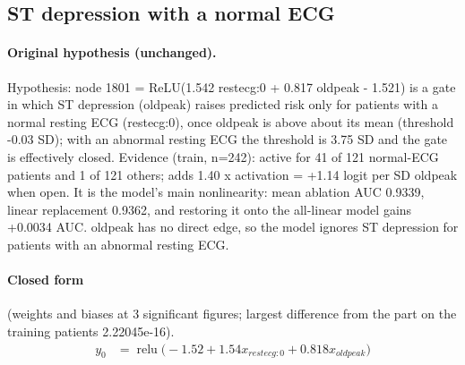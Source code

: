 \documentclass[a4paper,10pt]{article}
\newif\ifreviewmarks
\newcommand{\reviewrule}{\noindent{\color{BrickRed}\rule{\linewidth}{0.8pt}}}
\newenvironment{drafted}[1][]{%
  \ifreviewmarks\par\addvspace{\medskipamount}\reviewrule\par\nopagebreak
  \noindent{\color{BrickRed}\sffamily\footnotesize\textbf{Thesis Draft}\quad #1\hfill review}\par\nopagebreak\smallskip\fi}{%
  \ifreviewmarks\par\smallskip\noindent{\color{BrickRed}\sffamily\footnotesize end of thesis draft}\par\nopagebreak\reviewrule\par\medskip\fi}
\begin{document}
\begin{drafted}[plain-language layer: heart-s1-c1]
\subsection{ST depression with a normal ECG}\label{tech:ann31}
\paragraph{Original hypothesis (unchanged).} Hypothesis: node 1801 = ReLU(1.542 restecg:0 + 0.817 oldpeak - 1.521) is a gate in which ST depression (oldpeak) raises predicted risk only for patients with a normal resting ECG (restecg:0), once oldpeak is above about its mean (threshold -0.03 SD); with an abnormal resting ECG the threshold is 3.75 SD and the gate is effectively closed. Evidence (train, n=242): active for 41 of 121 normal-ECG patients and 1 of 121 others; adds 1.40 x activation = +1.14 logit per SD oldpeak when open. It is the model's main nonlinearity: mean ablation AUC 0.9339, linear replacement 0.9362, and restoring it onto the all-linear model gains +0.0034 AUC. oldpeak has no direct edge, so the model ignores ST depression for patients with an abnormal resting ECG.
\paragraph{Closed form} {\footnotesize(weights and biases at 3 significant figures; largest difference from the part on the training patients 2.22045e-16).}
{\small\begingroup\allowdisplaybreaks
\begin{align*}
y_{0} &= \operatorname{relu}\bigl(-1.52 + 1.54 x_{restecg:0} + 0.818 x_{oldpeak}\bigr)
\end{align*}\endgroup}


\end{drafted}
\end{document}
